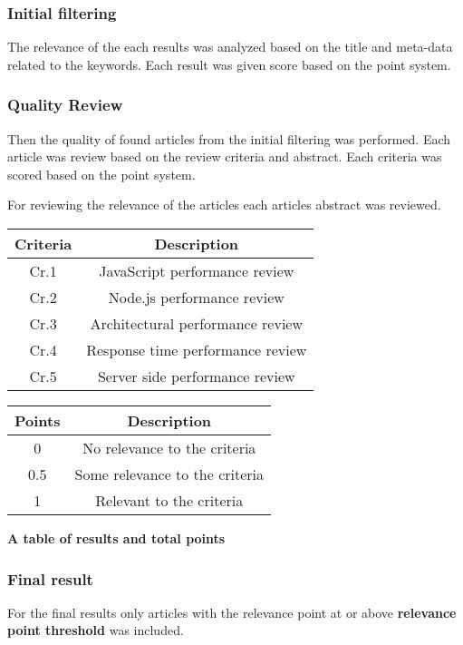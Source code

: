 \subsubsection{Initial filtering}
The relevance of the each results was analyzed based on the title and meta-data related to the keywords. Each result was given score based on the point system.

\subsubsection{Quality Review}
Then the quality of found articles from the initial filtering was performed.
Each article was review based on the review criteria and abstract.
Each criteria was scored based on the point system.

For reviewing the relevance of the articles each articles abstract was reviewed.

\begin{flushleft}
\begin{tabular}{|c c|} 
 \hline
 Criteria & Description \\ [0.5ex] 
 \hline
  Cr.1 & JavaScript performance review  \\ 
  \hline
  Cr.2 & Node.js performance review  \\ 
  \hline
  Cr.3 & Architectural performance review  \\ 
  \hline
  Cr.4 & Response time performance review  \\ 
  \hline
  Cr.5 & Server side performance review  \\ 
  \hline
\end{tabular}
\end{flushleft}


\begin{flushleft}
\begin{tabular}{|c c|} 
 \hline
 Points & Description \\ [0.5ex] 
 \hline
  0 & No relevance to the criteria  \\ 
 \hline
  0.5 & Some relevance to the criteria \\ 
 \hline
 1 & Relevant to the criteria \\ 
 \hline
\end{tabular}
\end{flushleft}

\textbf{A table of results and total points}

\subsubsection{Final result}
For the final results only articles with the relevance point at or above \textbf{relevance point threshold} was included.

